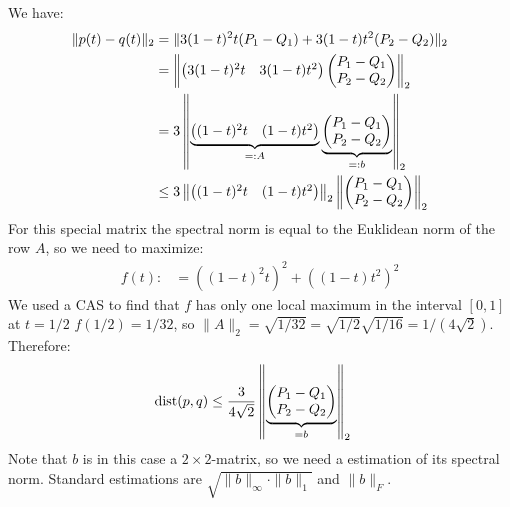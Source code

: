 We have:
%
\begin{align*}
\|p(t)-q(t)\|_2 &= \|3(1-t)^2 t (P_1-Q_1) + 3 (1-t) t^2 (P_2 - Q_2)\|_2 \\
&= \left\| \begin{pmatrix} 3(1-t)^2 t & 3(1-t)t^2 \end{pmatrix} \begin{pmatrix} P_1 - Q_1 \\ P_2 - Q_2 \end{pmatrix} \right\|_2 \\
&= 3 \left\| \underbrace{\begin{pmatrix} (1-t)^2 t & (1-t)t^2 \end{pmatrix}}_{=:A} \underbrace{\begin{pmatrix} P_1 - Q_1 \\ P_2 - Q_2 \end{pmatrix}}_{=: b} \right\|_2 \\
&\leq 3 \left\| \begin{pmatrix} (1-t)^2 t & (1-t)t^2 \end{pmatrix} \right\|_2 \left\| \begin{pmatrix} P_1 - Q_1 \\ P_2 - Q_2 \end{pmatrix} \right\|_2 \\
\end{align*}
%
For this special matrix the spectral norm is equal to the Euklidean norm of the row $A$, so we need to maximize:
%
\begin{align*}
f(t) :&= ((1-t)^2t)^2 + ((1-t)t^2)^2 
\end{align*}
%
We used a CAS to find that $f$ has only one local maximum in the interval $[0,1]$ at $t=1/2$
$f(1/2) = 1/32$, so $\|A\|_2 = \sqrt{1/32} = \sqrt{1/2}\sqrt{1/16} = 1/(4\sqrt 2)$.
Therefore:
%
\begin{align*}
\mathrm{dist}(p,q) &\leq \frac{3}{4\sqrt 2} \left\| \underbrace{\begin{pmatrix} P_1 - Q_1 \\ P_2 - Q_2 \end{pmatrix}}_{=b} \right\|_2
\end{align*}
%
Note that $b$ is in this case a $2\times 2$-matrix, so we need a estimation of its spectral norm.
Standard estimations are $\sqrt{\|b\|_\infty \cdot \|b\|_1}$ and $\|b\|_F$.


